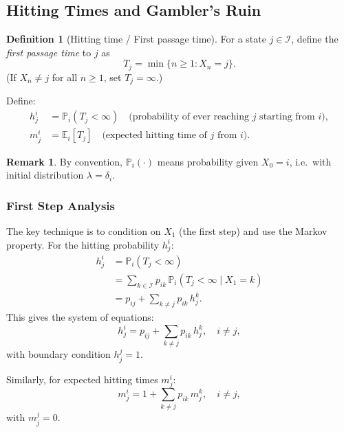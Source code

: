 \documentclass[12pt, a4paper]{article}
\theoremstyle{definition}
\newtheorem{definition}{Definition}[section]
\newtheorem{remark}{Remark}[section]
\theoremstyle{plain}
\newcommand{\PP}{\mathbb{P}}
\newcommand{\EE}{\mathbb{E}}
\newcommand{\II}{\mathcal{I}}
\begin{document}
\subsection{Hitting Times and Gambler's Ruin}

\begin{definition}[Hitting time / First passage time]
For a state $j \in \II$, define the \emph{first passage time} to $j$ as
\begin{equation*}
  T_j = \min\{n \ge 1 : X_n = j\}.
\end{equation*}
(If $X_n \neq j$ for all $n \ge 1$, set $T_j = \infty$.)

Define:
\begin{align*}
  h_j^i &= \PP_i(T_j < \infty) \quad \text{(probability of ever reaching } j \text{ starting from } i\text{)},\\
  m_j^i &= \EE_i[T_j] \quad \text{(expected hitting time of } j \text{ from } i\text{)}.
\end{align*}
\end{definition}

\begin{remark}
By convention, $\PP_i(\cdot)$ means probability given $X_0 = i$, i.e.\ with initial distribution $\lambda = \delta_i$.
\end{remark}

\subsubsection{First Step Analysis}

The key technique is to condition on $X_1$ (the first step) and use the Markov property. For the hitting probability $h_j^i$:
\begin{align*}
  h_j^i &= \PP_i(T_j < \infty) \\
         &= \sum_{k \in \II} p_{ik}\, \PP_i(T_j < \infty \mid X_1 = k)\\
         &= p_{ij} + \sum_{k \neq j} p_{ik}\, h_j^k.
\end{align*}
This gives the system of equations:
\begin{equation*}
  h_j^i = p_{ij} + \sum_{k \neq j} p_{ik}\, h_j^k, \quad i \neq j,
\end{equation*}
with boundary condition $h_j^j = 1$.

Similarly, for expected hitting times $m_j^i$:
\begin{equation*}
  m_j^i = 1 + \sum_{k \neq j} p_{ik}\, m_j^k, \quad i \neq j,
\end{equation*}
with $m_j^j = 0$.
\end{document}
